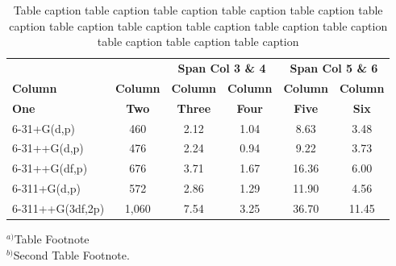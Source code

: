 \documentclass{jpp}
\begin{document}
\begin{table}
\begin{center}
\caption{Table caption table caption table caption table caption table caption table
caption table caption table caption table caption table caption table
caption table caption table caption table caption}
{\begin{tabular}{@{}lccccc@{}}
& & \multicolumn{2}{c}{\textbf{Span Col 3 \& 4}} & \multicolumn{2}{c}{\textbf{Span Col 5 \& 6}}\\
\textbf{Column} & \textbf{Column} & \textbf{Column} & \textbf{Column} & \textbf{Column} & \textbf{Column}\\
\textbf{One} & \textbf{Two} & \textbf{Three} & \textbf{Four} & \textbf{Five} & \textbf{Six}\\[6pt]
6-31+G(d,p) & 460 & 2.12 & 1.04 & 8.63 & 3.48\\
6-31++G(d,p) & 476 & 2.24 & 0.94 & 9.22 & 3.73\\
6-31++G(df,p) & 676 & 3.71 & 1.67 & 16.36 & 6.00\\
6-311+G(d,p) & 572 & 2.86 & 1.29 & 11.90 & 4.56\\
6-311++G(3df,2p) & 1,060 & 7.54 & 3.25 & 36.70 & 11.45\\[6pt]
\end{tabular}}{\par$^{a)}$Table Footnote\\
$^{b)}$Second Table Footnote.}
\end{center}
\end{table}
%
\end{document}
